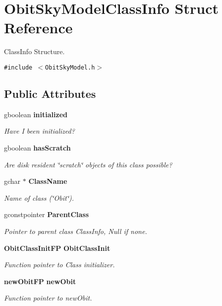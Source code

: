 \section{Obit\-Sky\-Model\-Class\-Info Struct Reference}
\label{structObitSkyModelClassInfo}
Class\-Info Structure.  


{\tt \#include $<$Obit\-Sky\-Model.h$>$}

\subsection*{Public Attributes}
\begin{CompactItemize}
\item 
gboolean {\bf initialized}
\begin{CompactList}\small\item\em Have I been initialized? \item\end{CompactList}\item 
gboolean {\bf has\-Scratch}
\begin{CompactList}\small\item\em Are disk resident \char`\"{}scratch\char`\"{} objects of this class possible? \item\end{CompactList}\item 
gchar $\ast$ {\bf Class\-Name}
\begin{CompactList}\small\item\em Name of class (\char`\"{}Obit\char`\"{}). \item\end{CompactList}\item 
gconstpointer {\bf Parent\-Class}
\begin{CompactList}\small\item\em Pointer to parent class Class\-Info, Null if none. \item\end{CompactList}\item 
{\bf Obit\-Class\-Init\-FP} {\bf Obit\-Class\-Init}
\begin{CompactList}\small\item\em Function pointer to Class initializer. \item\end{CompactList}\item 
{\bf new\-Obit\-FP} {\bf new\-Obit}
\begin{CompactList}\small\item\em Function pointer to new\-Obit. \item\end{CompactList}\item 

\end{CompactItemize}
